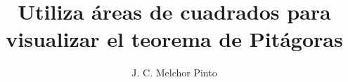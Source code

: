 \documentclass[12pt]{guia}
\title{Utiliza áreas de cuadrados para visualizar el teorema de Pitágoras}
\author{J. C. Melchor Pinto}
\begin{document}
\pagestyle{headandfoot}
\addpoints
\INFO
\printanswers

\newpage
\begin{questions}
    \questionboxed[10] 
    \questionboxed[10] 
    \questionboxed[10] 
    \questionboxed[10] 
    \questionboxed[10] 
    \questionboxed[10] 
    \questionboxed[10] 
    \questionboxed[10] 
    \questionboxed[10] 
\end{questions}
\end{document}
